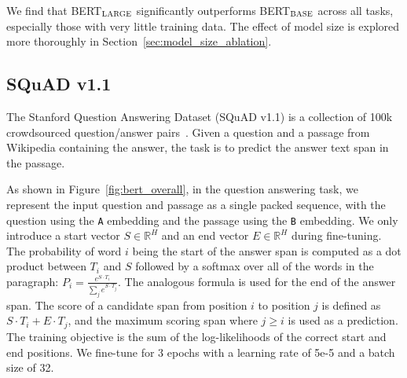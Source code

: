 \documentclass[11pt,a4paper]{article}
\newcommand{\eat}[1]{\ignorespaces}
\newcommand\bertbase{BERT$_{\small \textsc{BASE}}$\xspace}
\newcommand\bertlarge{BERT$_{\small \textsc{LARGE}}$\xspace}
\begin{document}
We find that \bertlarge significantly outperforms \bertbase across all tasks, especially those with very little training data. The effect of model size is explored more thoroughly in Section~\ref{sec:model_size_ablation}.

\subsection{SQuAD v1.1}
\label{sec:squad}

The Stanford Question Answering Dataset (SQuAD v1.1) is a collection of 100k crowdsourced question/answer pairs~\cite{rajpurkar-etal:2016:_squad}. Given a question and a passage from Wikipedia containing the answer, the task is to predict the answer text span in the passage. 

\eat{
For example: 

\begin{itemize}
\item Input Question: \\{\tt {\scriptsize  Where do water droplets collide with ice crystals to form precipitation?}}
\item Input Paragraph: \\{\tt {\scriptsize  ... Precipitation forms as smaller droplets coalesce via collision with other rain drops or ice crystals within a cloud. ...}}
\item Output Answer: \\ {\tt {\scriptsize  within a cloud}}
\end{itemize}
}

As shown in Figure~\ref{fig:bert_overall}, in the question answering task,
we represent the input question and passage as a single packed sequence, with the question using the {\tt A} embedding and the passage using the {\tt B} embedding. We only introduce a start vector $S \in \mathbb{R}^H$ and an end vector $E \in \mathbb{R}^H$ during fine-tuning.
The probability of word $i$ being the start of the answer span is computed as a dot product between $T_i$ and $S$ followed by a softmax over all of the words in the paragraph: $P_i = \frac{e^{S{\cdot}T_i}}{\sum_j e^{S{\cdot}T_j}}$. The analogous formula is used for the end of the answer span. The score of a candidate span from position $i$ to position $j$ is defined as  $S{\cdot}T_i + E{\cdot}T_j$, and the maximum scoring span where $j \geq i$ is used as a prediction. The training objective is the sum of the log-likelihoods of the correct start and end positions. We fine-tune for 3 epochs with a learning rate of 5e-5 and a batch size of 32. 
\end{document}
